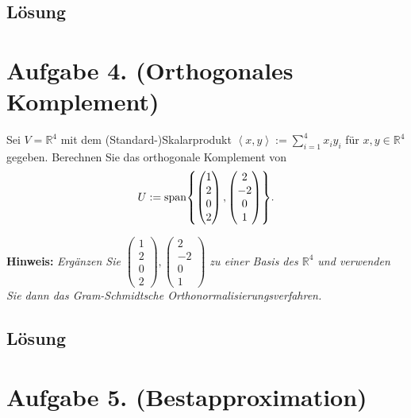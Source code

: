 \documentclass[german,12pt]{homework}
\newcommand{\RR}{\mathbb{R}}
\newcommand{\dotproduct}[2]{\left\langle#1, #2\right\rangle}
\DeclareMathOperator{\vecspan}{span}
\DeclarePairedDelimiter{\penbrace}{\{}{\}}
\begin{document}
    \subsection*{Lösung}

    \section*{Aufgabe 4. (Orthogonales Komplement)}

    \begin{problem}
        Sei \(V = \RR^4\) mit dem (Standard-)Skalarprodukt \(\dotproduct{x}{y}
        := \sum_{i = 1}^4x_iy_i\) für \(x, y \in \RR^4\) gegeben. Berechnen Sie
        das orthogonale Komplement von
        \[U := \vecspan\penbrace*{\begin{pmatrix}1\\2\\0\\2\end{pmatrix},
        \begin{pmatrix}2\\-2\\0\\1\end{pmatrix}}.\]

        \textbf{Hinweis:} \emph{Ergänzen Sie
        \(\begin{pmatrix}1\\2\\0\\2\end{pmatrix}, \begin{pmatrix}2\\-
        2\\0\\1\end{pmatrix}\) zu einer Basis des \(\RR^4\) und verwenden Sie
        dann das Gram-Schmidtsche Orthonormalisierungsverfahren.}
    \end{problem}

    \subsection*{Lösung}

    \section*{Aufgabe 5. (Bestapproximation)}
\end{document}
